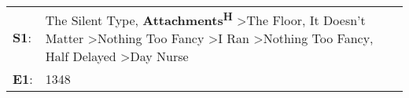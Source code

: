 \begin{supertabular}{p{0.03\textwidth}p{0.92\textwidth}}
 \textbf{S1}:  &  The Silent Type\textsuperscript{}, \enspace \textbf{Attachments\textsuperscript{H}} \textgreater \enspace The Floor\textsuperscript{}, \enspace It Doesn't Matter\textsuperscript{} \textgreater \enspace Nothing Too Fancy\textsuperscript{} \textgreater \enspace I Ran\textsuperscript{} \textgreater \enspace Nothing Too Fancy\textsuperscript{}, \enspace Half Delayed\textsuperscript{} \textgreater \enspace Day Nurse\textsuperscript{}  \enspace  \\
 \textbf{E1}:  &                                                                                                                                                                                                                                                                                                                                                                                                                            1348\textsuperscript{}  \enspace  \\
\end{supertabular}
